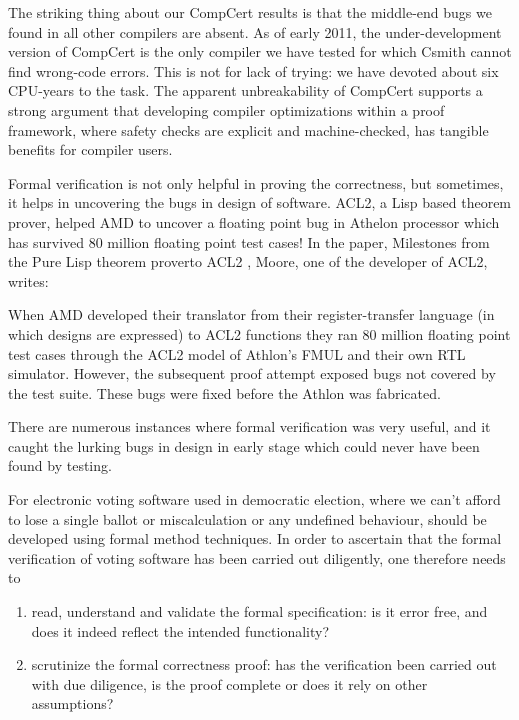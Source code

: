 	\begin{displayquote}
	
	The striking thing about our CompCert results is that the middle-end 
	bugs we found in all other compilers are absent. As of early 2011,
	the under-development version of CompCert is the only compiler we
	have tested for which Csmith cannot find wrong-code errors. This is
	not for lack of trying: we have devoted about six CPU-years to the
	task. The apparent unbreakability of CompCert supports a strong
	argument that developing compiler optimizations within a proof
	framework, where safety checks are explicit and machine-checked,
	has tangible benefits for compiler users.
	
	\end{displayquote}
	
	\noindent
	Formal verification is not only helpful in proving the correctness, 
	but sometimes, it helps in uncovering the bugs in design of
	software. ACL2, a Lisp based theorem prover, helped 
	AMD to uncover a floating point bug in Athelon processor which 
	has survived 80 million floating point test cases! 
	In the paper, Milestones from the Pure Lisp theorem proverto ACL2
	\citep{Moore2019}, Moore, one of the developer of ACL2, writes:
	
	\begin{displayquote}
	
	When AMD developed their translator 
	from their register-transfer language (in which designs
	are expressed) to ACL2 functions they ran 80 million 
	floating point test cases through the ACL2 model of 
	Athlon’s FMUL and their own RTL simulator. However, the 
	subsequent proof attempt exposed bugs not covered by the
	test suite. These bugs were fixed before the Athlon was 
	fabricated.
	
	\end{displayquote}
  
   \noindent
   There are numerous instances where formal verification 
	was very useful, and it caught the lurking bugs in design in early 
	stage which could never have been found by testing.
	
	For electronic voting software used in democratic election, where we 
	can't afford to lose a single ballot or miscalculation 
	or any undefined behaviour, should be developed 
	using formal method techniques. 
	In order to ascertain that the formal verification of voting software has been 
	carried out diligently, one therefore needs to
	\begin{enumerate}
	\item read, understand and validate the formal specification: is it 
	error free, and does it indeed reflect the intended functionality?
	\item scrutinize the formal correctness proof: has the verification
	been carried out with due diligence, is the proof complete or does
	it rely on other assumptions?
	
	\end{enumerate}			
	
